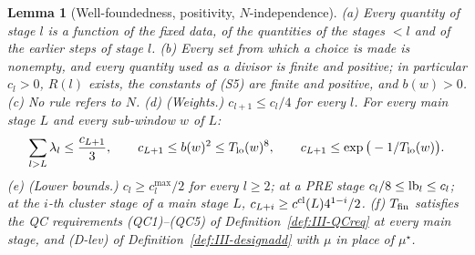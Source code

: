 \documentclass[10pt]{amsart}
\newtheorem{lemma}[theorem]{Lemma}
\theoremstyle{definition}
\theoremstyle{remark}
\begin{document}
\begin{lemma}[Well-foundedness, positivity, $N$-independence]\label{lem:III-Wfin}
\textup{(a)} Every quantity of stage $l$ is a function of the fixed data, of the
quantities of the stages $<l$ and of the earlier steps of stage $l$.
\textup{(b)} Every set from which a choice is made is nonempty, and every
quantity used as a divisor is finite and positive; in particular $c_l>0$,
$R(l)$ exists, the constants of \textup{(S5)} are finite and positive, and
$b(w)>0$.
\textup{(c)} No rule refers to $N$.
\textup{(d)} \textup{(Weights.)}  $c_{l+1}\le c_l/4$ for every $l$.  For every
main stage $L$ and every sub-window $w$ of $L$:
\[
 \sum_{l>L}\lambda_l\le\frac{c_{L+1}}3,\qquad c_{L+1}\le b(w)^2\le T_{\rm lo}(w)^8,
 \qquad c_{L+1}\le\exp\big(-1/T_{\rm lo}(w)\big).
\]
\textup{(e)} \textup{(Lower bounds.)}  $c_l\ge c^{\max}_l/2$ for every $l\ge2$;
at a PRE stage $c_l/8\le{\rm lb}_l\le c_l$; at the $i$-th cluster stage of a main
stage $L$, $c_{L+i}\ge c^{\rm cl}(L)4^{1-i}/2$.
\textup{(f)} $T_{\rm fin}$ satisfies the QC requirements \textup{(QC1)--(QC5)} of
Definition~\textup{\ref{def:III-QCreq}} at every main stage, and \textup{(D-lev)}
of Definition~\textup{\ref{def:III-designadd}} with $\mu$ in place of $\mu^\star$.
\end{lemma}
\end{document}
